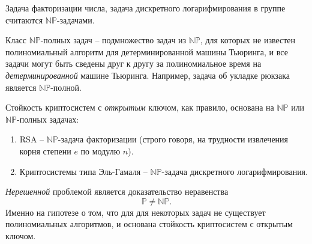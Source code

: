 \documentclass[10pt,a4paper]{book}
\newcommand{\set}[1]{\mathbb{#1}}
\begin{document}
Задача факторизации числа, задача дискретного логарифмирования в группе считаются $\set{NP}$-задачами.

Класс $\set{NP}$-полных задач -- подмножество задач из $\set{NP}$, для которых не известен полиномиальный алгоритм для детерминированной машины Тьюринга, и все задачи могут быть сведены друг к другу за полиномиальное время на \emph{детерминированной} машине Тьюринга. Например, задача об укладке рюкзака является $\set{NP}$-полной.

Стойкость криптосистем с \emph{открытым} ключом, как правило, основана на $\set{NP}$ или $\set{NP}$-полных задачах:
\begin{enumerate}
    \item RSA -- $\set{NP}$-задача факторизации (строго говоря, на трудности извлечения корня степени $e$ по модулю $n$).
    \item Криптосистемы типа Эль-Гамаля -- $\set{NP}$-задача дискретного логарифмирования.
\end{enumerate}

\emph{Нерешенной} проблемой является доказательство неравенства
    \[ \set{P} \neq \set{NP}. \]
Именно на гипотезе о том, что для для некоторых задач не существует полиномиальных алгоритмов, и основана стойкость криптосистем с открытым ключом.


\end{document}
